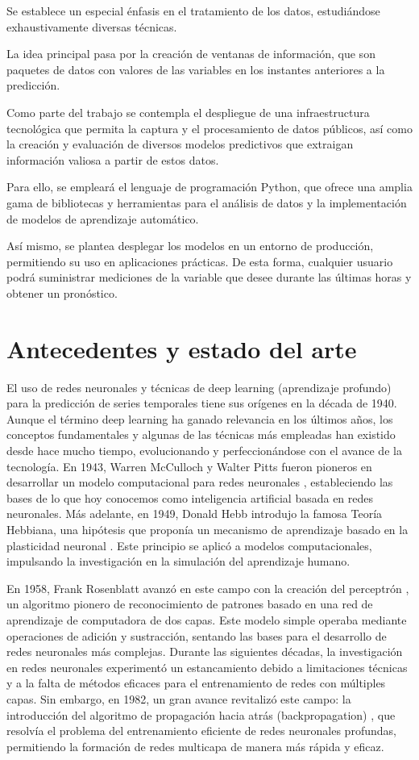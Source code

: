 Se establece un especial énfasis en el tratamiento de los datos, estudiándose exhaustivamente diversas técnicas.

La idea principal pasa por la creación de ventanas de información, que son paquetes de datos con valores de las variables en los instantes anteriores a la predicción. 

Como parte del trabajo se contempla el despliegue de una infraestructura tecnológica que permita la captura y el procesamiento de datos públicos,
 así como la creación y evaluación de diversos modelos predictivos que extraigan información valiosa a partir de estos datos.
 
Para ello, se empleará el lenguaje de programación Python, que ofrece una amplia gama de bibliotecas y herramientas para el análisis de datos y la 
implementación de modelos de aprendizaje automático.

Así mismo, se plantea desplegar los modelos en un entorno de producción, permitiendo su uso en aplicaciones prácticas. 
De esta forma, cualquier usuario podrá suministrar mediciones de la variable que desee durante las últimas horas y obtener un pronóstico.

\section{Antecedentes y estado del arte}

El uso de redes neuronales y técnicas de deep learning (aprendizaje profundo) para la predicción de series temporales tiene sus orígenes en la década de 1940. Aunque el término deep learning ha ganado relevancia en los últimos años, los conceptos fundamentales y algunas de las técnicas más empleadas han existido desde hace mucho tiempo, evolucionando y perfeccionándose con el avance de la tecnología.
En 1943, Warren McCulloch y Walter Pitts fueron pioneros en desarrollar un modelo computacional para redes neuronales \cite{mcculloch1943}, 
estableciendo las bases de lo que hoy conocemos como inteligencia artificial basada en redes neuronales. 
Más adelante, en 1949, Donald Hebb introdujo la famosa Teoría Hebbiana, una hipótesis que proponía un mecanismo de aprendizaje basado en la plasticidad neuronal \cite{hebb1949}. 
Este principio se aplicó a modelos computacionales, impulsando la investigación en la simulación del aprendizaje humano.

En 1958, Frank Rosenblatt avanzó en este campo con la creación del perceptrón \cite{rosenblatt1958}, un algoritmo pionero de reconocimiento de patrones basado en una red de aprendizaje de computadora de dos capas.
Este modelo simple operaba mediante operaciones de adición y sustracción, sentando las bases para el desarrollo de redes neuronales más complejas.
Durante las siguientes décadas, la investigación en redes neuronales experimentó un estancamiento debido a limitaciones técnicas y a la falta de métodos eficaces para el entrenamiento de redes con múltiples capas. 
Sin embargo, en 1982, un gran avance revitalizó este campo: la introducción del algoritmo de propagación hacia atrás (backpropagation) \cite{werbos1982}, que resolvía el problema del entrenamiento eficiente de redes neuronales profundas, 
permitiendo la formación de redes multicapa de manera más rápida y eficaz.

